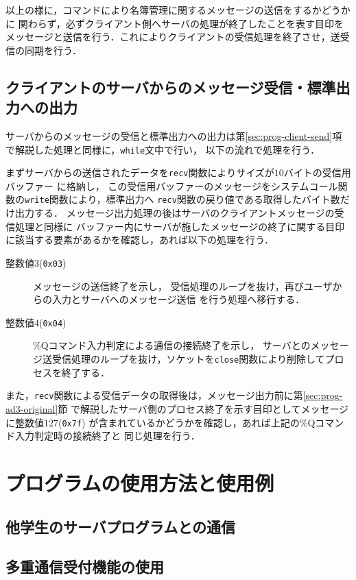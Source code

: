 以上の様に，コマンドにより名簿管理に関するメッセージの送信をするかどうかに
関わらず，必ずクライアント側へサーバの処理が終了したことを表す目印を
メッセージと送信を行う．これによりクライアントの受信処理を終了させ，送受信の同期を行う．

\subsection{クライアントのサーバからのメッセージ受信・標準出力への出力}
サーバからのメッセージの受信と標準出力への出力は第\ref{sec:prog-client-send}項
で解説した処理と同様に，\verb|while|文中で行い，
以下の流れで処理を行う．

まずサーバからの送信されたデータを\verb|recv|関数によりサイズが$10$バイトの受信用バッファー
に格納し，
この受信用バッファーのメッセージをシステムコール関数の\verb|write|関数により，標準出力へ
\verb|recv|関数の戻り値である取得したバイト数だけ出力する．
メッセージ出力処理の後はサーバのクライアントメッセージの受信処理と同様に
バッファー内にサーバが施したメッセージの終了に関する目印に該当する要素があるかを確認し，あれば以下の処理を行う．
\begin{description}
  \item[整数値$3$(\texttt{0x03})] メッセージの送信終了を示し，
  受信処理のループを抜け，再びユーザからの入力とサーバへのメッセージ送信
  を行う処理へ移行する．
  \item[整数値$4$(\texttt{0x04})] \%Qコマンド入力判定による通信の接続終了を示し，
  サーバとのメッセージ送受信処理のループを抜け，ソケットを\verb|close|関数により削除してプロセスを終了する．
\end{description}
また，\verb|recv|関数による受信データの取得後は，メッセージ出力前に第\ref{sec:prog-ad3-original}節
で解説したサーバ側のプロセス終了を示す目印としてメッセージに整数値$127$(\verb|0x7f|)
が含まれているかどうかを確認し，あれば上記の\%Qコマンド入力判定時の接続終了と
同じ処理を行う．

\section{プログラムの使用方法と使用例}

\subsection{他学生のサーバプログラムとの通信}

\subsection{多重通信受付機能の使用}

